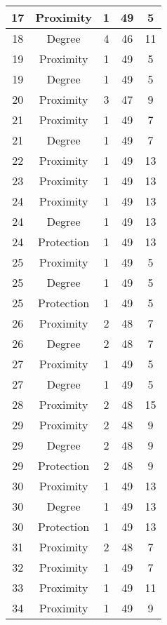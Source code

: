 \documentclass[results.tex]{subfiles}
\begin{document}
\begin{center}
\begin{tabular}{| c || c | c | c | c |}
    \hline
    17 & Proximity & 1 & 49 & 5 \\ 
    \hline
    18 & Degree & 4 & 46 & 11 \\ 
    \hline
    19 & Proximity & 1 & 49 & 5 \\ 
    \hline
    19 & Degree & 1 & 49 & 5 \\ 
    \hline
    20 & Proximity & 3 & 47 & 9 \\ 
    \hline
    21 & Proximity & 1 & 49 & 7 \\ 
    \hline
    21 & Degree & 1 & 49 & 7 \\ 
    \hline
    22 & Proximity & 1 & 49 & 13 \\ 
    \hline
    23 & Proximity & 1 & 49 & 13 \\ 
    \hline
    24 & Proximity & 1 & 49 & 13 \\ 
    \hline
    24 & Degree & 1 & 49 & 13 \\ 
    \hline
    24 & Protection & 1 & 49 & 13 \\ 
    \hline
    25 & Proximity & 1 & 49 & 5 \\ 
    \hline
    25 & Degree & 1 & 49 & 5 \\ 
    \hline
    25 & Protection & 1 & 49 & 5 \\ 
    \hline
    26 & Proximity & 2 & 48 & 7 \\ 
    \hline
    26 & Degree & 2 & 48 & 7 \\ 
    \hline
    27 & Proximity & 1 & 49 & 5 \\ 
    \hline
    27 & Degree & 1 & 49 & 5 \\ 
    \hline
    28 & Proximity & 2 & 48 & 15 \\ 
    \hline
    29 & Proximity & 2 & 48 & 9 \\ 
    \hline
    29 & Degree & 2 & 48 & 9 \\ 
    \hline
    29 & Protection & 2 & 48 & 9 \\ 
    \hline
    30 & Proximity & 1 & 49 & 13 \\ 
    \hline
    30 & Degree & 1 & 49 & 13 \\ 
    \hline
    30 & Protection & 1 & 49 & 13 \\ 
    \hline
    31 & Proximity & 2 & 48 & 7 \\ 
    \hline
    32 & Proximity & 1 & 49 & 7 \\ 
    \hline
    33 & Proximity & 1 & 49 & 11 \\ 
    \hline
    34 & Proximity & 1 & 49 & 9 \\ 
    \hline

\end{tabular}
\end{center}
\end{document}

